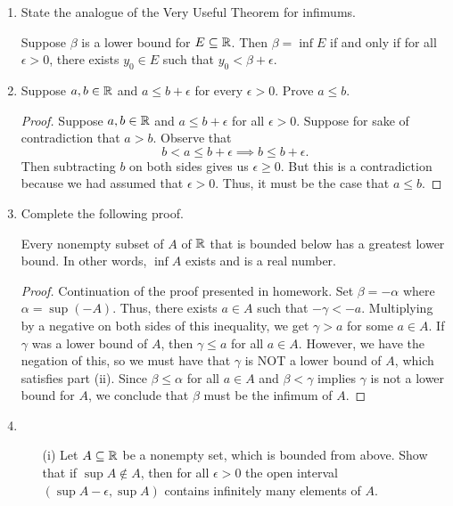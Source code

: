 \documentclass[11pt,a4paper]{article}
\begin{document}
\begin{enumerate}
\item State the analogue of the Very Useful Theorem for infimums. 
        \begin{solution}
        Suppose \( \beta  \) is a lower bound for \( E \subseteq \mathbb{R}    \). Then \( \beta = \inf E  \) if and only if for all \( \epsilon > 0  \), there exists \( {y}_{0} \in E  \) such that \( {y}_{0} < \beta + \epsilon  \).
        \end{solution}
    \item Suppose \( a,b \in \mathbb{R}  \) and \( a \leq b + \epsilon  \) for every \( \epsilon > 0  \). Prove \( a \leq b  \). \label{Problem 5}
        \begin{proof}
        Suppose \( a, b \in \mathbb{R}  \) and \( a \leq b + \epsilon  \) for all \( \epsilon > 0  \). Suppose for sake of contradiction that \(  a > b  \). Observe that 
        \[  b < a \leq b + \epsilon \implies b \leq b + \epsilon. \]
        Then subtracting \( b  \) on both sides gives us \( \epsilon \geq 0  \). But this is a contradiction because we had assumed that \( \epsilon > 0 \). Thus, it must be the case that \( a \leq b  \).
        \end{proof}
    \item Complete the following proof.   
\begin{theorem}
   Every nonempty subset of \( A  \) of \( \mathbb{R}  \) that is bounded below has a greatest lower bound. In other words, \( \inf A  \) exists and is a real number.   
\end{theorem}
\begin{proof}
Continuation of the proof presented in homework. Set \( \beta = - \alpha  \) where \(  \alpha  = \sup (-A )   \). Thus, there exists \( a \in A  \) such that \( - \gamma < - a  \). Multiplying by a negative on both sides of this inequality, we get \(  \gamma > a  \) for some \( a \in A  \). If \( \gamma  \) was a lower bound of \( A  \), then \( \gamma \leq a   \) for all \( a \in A  \). However, we have the negation of this, so we must have that \( \gamma  \) is NOT a lower bound of \( A  \), which satisfies part (ii). Since \( \beta \leq \alpha  \) for all \( a \in A  \) and \( \beta < \gamma  \) implies \( \gamma  \) is not a lower bound for \( A  \), we conclude that \( \beta  \) must be the infimum of \( A  \).  
\end{proof}
\item \begin{enumerate}
    \item[(i)] Let \( A \subseteq \mathbb{R}   \) be a nonempty set, which is bounded from above. Show that if \( \sup A \notin A  \), then for all \( \epsilon > 0  \) the open interval \( (\sup A - \epsilon, \sup A ) \) contains infinitely many elements of \( A  \).

\end{enumerate}
\end{enumerate}
\end{document}
